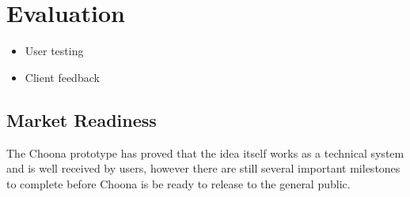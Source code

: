 \section{Evaluation}

\begin{itemize}
  \item User testing
  \item Client feedback
\end{itemize}


\subsection{Market Readiness}

The Choona prototype has proved that the idea itself works as a technical system and is well received by users, however there are still several important milestones to complete before Choona is be ready to release to the general public.


